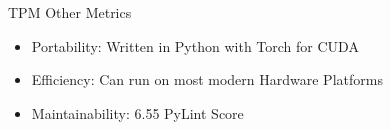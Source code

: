 \begin{frame}{TPM \textemdash{} Other Metrics}
    \begin{itemize}
        \item Portability: Written in Python with Torch for CUDA
        \item Efficiency: Can run on most modern Hardware Platforms
        \item Maintainability: 6.55 PyLint Score
    \end{itemize}
    \begin{table}[!htbp]
        \centering
        \caption{Efficiency of the system in terms of resource usage.}
    \end{table}
\end{frame}
